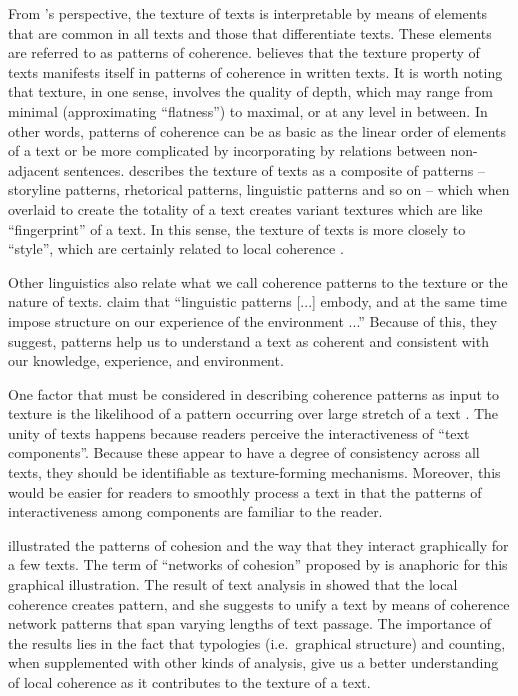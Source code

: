 From 's perspective, the texture of texts is interpretable by means of elements that are common in all texts and those that differentiate texts. 
These elements are referred to as patterns of coherence. 
 believes that the texture property of texts manifests itself in patterns of coherence in written texts. 
It is worth noting that texture, in one sense, involves the quality of depth, which may range from minimal (approximating ``flatness'') to maximal, or at any level in between. 
In other words, patterns of coherence can be as basic as the linear order of elements of a text or be more complicated by incorporating by relations between non-adjacent sentences. 
 describes the texture of texts as a composite of patterns -- storyline patterns, rhetorical patterns, linguistic patterns and so on -- which when overlaid to create the totality of a text creates variant textures which are like ``fingerprint'' of a text. 
In this sense, the texture of texts is more closely to ``style'', which are certainly related \cite{stoddard91} to local coherence \cite{barzilay08}. 

Other linguistics also relate what we call coherence patterns to the texture or the nature of texts. 
 claim that ``linguistic patterns  [...] embody, and at the same time impose structure on our experience of the environment ...''
Because of this, they suggest, patterns help us to understand a text as coherent and consistent with our knowledge, experience, and environment. 

One factor that must be considered in describing coherence patterns as input to texture is the likelihood of a pattern occurring over large stretch of a text \cite{stoddard91} . 
The unity of texts happens because readers perceive the interactiveness of ``text components''. 
Because these appear to have a degree of consistency across all texts, they should be identifiable as texture-forming mechanisms.
Moreover, this would be easier for readers to smoothly process a text in that the patterns of interactiveness among components are familiar to the reader.  

 illustrated the patterns of cohesion and the way that they interact graphically for a few texts. 
The term of ``networks of cohesion'' proposed by  is anaphoric for this graphical illustration. 
The result of text analysis in  showed that the local coherence creates pattern, and she suggests to unify a text by means of coherence network patterns that span varying lengths of text passage. 
The importance of the results lies in the fact that typologies (i.e.\ graphical structure) and counting, when supplemented with other kinds of analysis, give us a better understanding of local coherence as it contributes to the texture of a text. 

